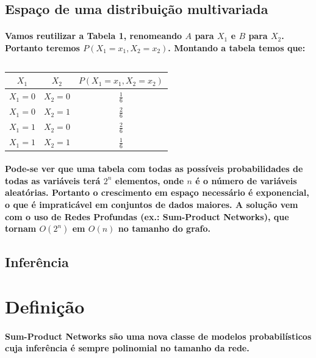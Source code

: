 \documentclass[a4paper,10pt]{article}
\theoremstyle{plain}
\begin{document}
\subsection{Espaço de uma distribuição multivariada}

\paragraph{
  Vamos reutilizar a Tabela 1, renomeando $A$ para $X_1$ e $B$ para $X_2$. Portanto teremos $P(X_1=x_1,X_2=x_2)$. 
Montando a tabela temos que:
}

\begin{table}[h*]
\caption{}
\begin{tabular}{*{3}{c}}
$X_1$ & $X_2$ & $P(X_1=x_1,X_2=x_2)$ \\
\hline
$X_1=0$ & $X_2=0$ & $\frac{1}{6}$ \\
$X_1=0$ & $X_2=1$ & $\frac{2}{6}$ \\
$X_1=1$ & $X_2=0$ & $\frac{2}{6}$ \\
$X_1=1$ & $X_2=1$ & $\frac{1}{6}$ \\
\end{tabular}
\end{table}

\paragraph{
  Pode-se ver que uma tabela com todas as possíveis probabilidades de todas as variáveis terá $2^n$ elementos, 
onde $n$ é o número de variáveis aleatórias. Portanto o crescimento em espaço necessário é exponencial, o que
é impraticável em conjuntos de dados maiores. A solução vem com o uso de Redes Profundas (ex.: Sum-Product Networks), 
que tornam $O(2^n)$ em $O(n)$ no tamanho do grafo.
}

\subsection{Inferência}



\section{Definição}

\paragraph{
  Sum-Product Networks são uma nova classe de modelos probabilísticos cuja inferência é sempre
polinomial no tamanho da rede.
}
\end{document}
